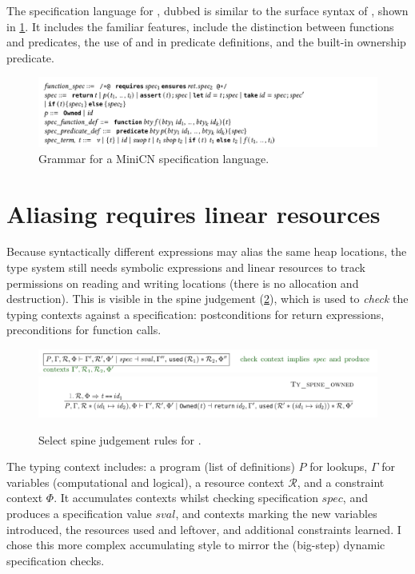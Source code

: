 The specification language for , dubbed  is similar to the
surface syntax of , shown in \cref{fig:minic-grammar}. It includes the
familiar features, include the distinction between functions and predicates,
the use of  and  in predicate definitions, and
the built-in ownership predicate.

\begin{figure}[tp]
    \includegraphics{figures/minicn-grammar}
    \caption{Grammar for a MiniCN specification language.}\label{fig:minic-grammar}
\end{figure}

\section{Aliasing requires linear resources}

Because syntactically different expressions may alias the same heap locations,
the type system still needs symbolic expressions and linear resources to track
permissions on reading and writing locations (there is no allocation and
destruction). This is visible in the spine judgement (\cref{fig:minicn-spine}),
which is used to \emph{check} the typing contexts against a specification:
postconditions for return expressions, preconditions for function calls.

\begin{figure}[tpb]
    \ContinuedFloat*
    \includegraphics{figures/minicn-spine-1}
    \includegraphics{figures/minicn-spine-2}
    \caption{Select spine judgement rules for .}\label{fig:minicn-spine}
\end{figure}

The typing context includes: a program (list of definitions) $P$ for lookups,
$\Gamma$ for variables (computational and logical), a resource context
$\mathcal{R}$, and a constraint context $\Phi$. It accumulates contexts whilst
checking specification $\mathit{spec}$, and produces a specification value
$\mathit{sval}$, and contexts marking the new variables introduced, the
resources used and leftover, and additional constraints learned. I chose this
more complex accumulating style to mirror the (big-step) dynamic specification
checks.

